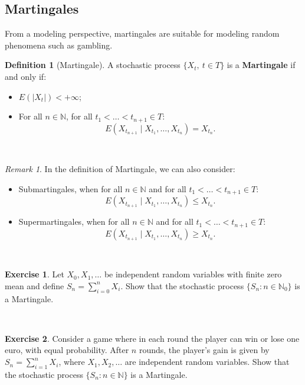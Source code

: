 \documentclass[
  11pt,
  a4paper,
]{book}
\theoremstyle{definition}
\newtheorem{definition}{Definition}[chapter]
\theoremstyle{definition}
\theoremstyle{definition}
\newtheorem{exercise}{Exercise}[chapter]
\theoremstyle{definition}
\theoremstyle{remark}
\newtheorem*{remark}{Remark}
\begin{document}
\subsection{Martingales}\label{martingales}

From a modeling perspective, martingales are suitable for modeling random phenomena such as gambling.

\begin{definition}[Martingale]

A stochastic process \(\{X_t, ~ t \in T\}\) is a \textbf{Martingale} if and only if:

\begin{itemize}
\item
  \(E(|X_t|) < +\infty\);
\item
  For all \(n \in \mathbb{N}\), for all \(t_1 < \ldots < t_{n+1} \in T\):
  \[
  E(X_{t_{n+1}} \mid X_{t_1}, \ldots, X_{t_n}) = X_{t_n}.
  \]
\end{itemize}

\end{definition}

\(\,\)

\begin{remark}

In the definition of Martingale, we can also consider:

\begin{itemize}
\item
  Submartingales, when for all \(n \in \mathbb{N}\) and for all \(t_1 < \ldots < t_{n+1} \in T\):
  \[
  E(X_{t_{n+1}} \mid X_{t_1}, \ldots, X_{t_n}) \leq X_{t_n}.
  \]
\item
  Supermartingales, when for all \(n \in \mathbb{N}\) and for all \(t_1 < \ldots < t_{n+1} \in T\):
  \[
  E(X_{t_{n+1}} \mid X_{t_1}, \ldots, X_{t_n}) \geq X_{t_n}.
  \]
\end{itemize}

\end{remark}

\(\,\)

\begin{exercise}
\leavevmode

Let \(X_0, X_1, \dots\) be independent random variables with finite zero mean and define \(S_n = \sum_{i=0}^n X_i\). Show that the stochastic process \(\{S_n: n \in \mathbb{N}_0\}\) is a Martingale.

\end{exercise}

\(\,\)

\begin{exercise}
\leavevmode

Consider a game where in each round the player can win or lose one euro, with equal probability. After \(n\) rounds, the player's gain is given by \(S_n = \sum_{i=1}^n X_i\), where \(X_1, X_2, \dots\) are independent random variables. Show that the stochastic process \(\{S_n: n \in \mathbb{N}\}\) is a Martingale.

\end{exercise}
\end{document}
